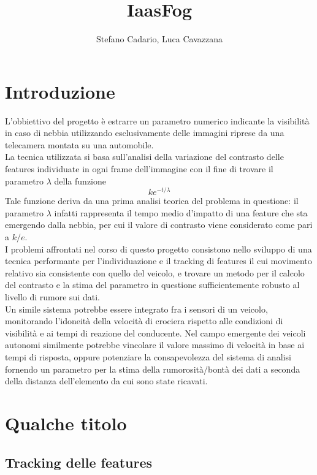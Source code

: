\documentclass[12pt]{report}
\title {IaasFog}
\author{Stefano Cadario, Luca Cavazzana}
\begin{document}
\maketitle

\tableofcontents

\chapter{Introduzione}

\noindent L'obbiettivo del progetto \`e estrarre un parametro numerico indicante la visibilit\`a in caso di nebbia utilizzando esclusivamente delle immagini riprese da una telecamera montata su una automobile.\\
La tecnica utilizzata si basa sull'analisi della variazione del contrasto delle features individuate in ogni frame dell'immagine con il fine di trovare il parametro $\lambda$ della funzione $$ke^{-t/\lambda}$$ Tale funzione deriva da una prima analisi teorica del problema in questione: il parametro $\lambda$ infatti rappresenta il tempo medio d'impatto di una feature che sta emergendo dalla nebbia, per cui il valore di contrasto viene considerato come pari a $k/e$.\\
I problemi affrontati nel corso di questo progetto consistono nello sviluppo di una tecnica performante per l'individuazione e il tracking di features il cui movimento relativo sia consistente con quello del veicolo, e trovare un metodo per il calcolo del contrasto e la stima del parametro in questione sufficientemente robusto al livello di rumore sui dati.\\
	 	
\noindent Un simile sistema potrebbe essere integrato fra i sensori di un veicolo, monitorando l'idoneit\`a della velocit\`a di crociera rispetto alle condizioni di visibilit\`a e ai tempi di reazione del conducente. Nel campo emergente dei veicoli autonomi similmente potrebbe vincolare il valore massimo di velocit\`a in base ai tempi di risposta, oppure potenziare la consapevolezza del sistema di analisi fornendo un parametro per la stima della rumorosit\`a/bont\`a dei dati a seconda della distanza dell'elemento da cui sono state ricavati.

\chapter{Qualche titolo}

\section{Tracking delle features}
\end{document}
